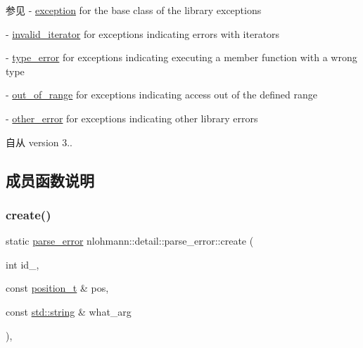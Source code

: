 \begin{DoxySeeAlso}{参见}
-\/ \mbox{\hyperlink{classnlohmann_1_1detail_1_1exception}{exception}} for the base class of the library exceptions 

-\/ \mbox{\hyperlink{classnlohmann_1_1detail_1_1invalid__iterator}{invalid\+\_\+iterator}} for exceptions indicating errors with iterators 

-\/ \mbox{\hyperlink{classnlohmann_1_1detail_1_1type__error}{type\+\_\+error}} for exceptions indicating executing a member function with a wrong type 

-\/ \mbox{\hyperlink{classnlohmann_1_1detail_1_1out__of__range}{out\+\_\+of\+\_\+range}} for exceptions indicating access out of the defined range 

-\/ \mbox{\hyperlink{classnlohmann_1_1detail_1_1other__error}{other\+\_\+error}} for exceptions indicating other library errors
\end{DoxySeeAlso}
\begin{DoxySince}{自从}
version 3.. 
\end{DoxySince}


\subsection{成员函数说明}
\mbox{\label{classnlohmann_1_1detail_1_1parse__error_a137ea4d27de45d8a844fd13451d40f3d}} 
\subsubsection{\texorpdfstring{create()}{create()}}
{\footnotesize\ttfamily static \mbox{\hyperlink{classnlohmann_1_1detail_1_1parse__error}{parse\+\_\+error}} nlohmann\+::detail\+::parse\+\_\+error\+::create (\begin{DoxyParamCaption}\item[{int}]{id\+\_\+,  }\item[{const \mbox{\hyperlink{structnlohmann_1_1detail_1_1position__t}{position\+\_\+t}} \&}]{pos,  }\item[{const \mbox{\hyperlink{namespacenlohmann_1_1detail_a1ed8fc6239da25abcaf681d30ace4985ab45cffe084dd3d20d928bee85e7b0f21}{std\+::string}} \&}]{what\+\_\+arg }\end{DoxyParamCaption})\hspace{0.3cm}{\ttfamily [inline]}, {\ttfamily [static]}}



